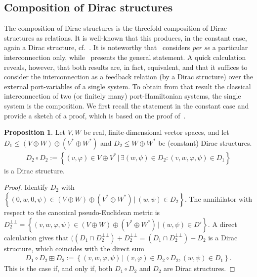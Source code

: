 \documentclass[preprint,12pt]{elsarticle}
\theoremstyle{definition}
\newtheorem{proposition}[theorem]{Proposition}
\newcommand{\bbot}{{\bot\!\!\!\bot}}
\newcommand{\set}[1]{\left\lbrace #1\right\rbrace}
\begin{document}
\subsection{Composition of Dirac structures}\label{geometric_approach}

The composition of Dirac structures is the threefold composition of Dirac structures as relations. It is well-known that this produces, in the constant case, again a Dirac structure, cf.~\cite{Interconnection07,Interconnection18}. It is noteworthy that~\cite{Interconnection07} considers \textit{per se} a particular interconnection only, while~\cite{Interconnection18} presents the general statement. A quick calculation reveals, however, that both results are, in fact, equivalent, and that it suffices to consider the interconnection as a feedback relation (by a Dirac structure) over the external port-variables of a single system. To obtain from that result the classical interconnection of two (or finitely many) port-Hamiltonian systems, the single system is the composition. We first recall the statement in the constant case and provide a sketch of a proof, which is based on the proof of~\cite[Lemma 5.2]{Burs13}.

\begin{proposition}\label{prop:geometric_composition}
Let $V,W$ be real, finite-dimensional vector spaces, and let ${D}_1\leq (V\oplus W)\oplus (V^*\oplus W^*)$ and ${D}_2\leq W\oplus W^*$ be (constant) Dirac structures.
\begin{align*}
{D}_2\circ{D}_2 := \set{(v,\varphi)\in V\oplus V^*\,\big\vert\,\exists (w,\psi)\in{D}_2: (v,w,\varphi,\psi)\in D_1}
\end{align*}
is a Dirac structure.
\end{proposition}
\begin{proof}
Identify $D_2$ with $\set{(0,w,0,\psi)\in(V\oplus W)\oplus (V^*\oplus W^*)\,\big\vert\,(w,\psi)\in D_2}$. The annihilator with respect to the canonical pseudo-Euclidean metric is $D_2^\bbot = \set{(v,w,\varphi,\psi)\in(V\oplus W)\oplus (V^*\oplus W^*)\,\big\vert\,(w,\psi)\in D'}$. A direct calculation gives that $((D_1\cap D_2^\bbot)+D_2^\bbot = (D_1\cap D_2^\bbot)+D_2$ is a Dirac structure, which coincides with the direct sum
\begin{align*}
{D}_1\circ{D}_2\boxplus D_2 := \set{(v,w,\varphi,\psi)\,\big\vert\,(v,\varphi)\in{D}_2\circ{D}_2, (w,\psi)\in D_1}.
\end{align*}
This is the case if, and only if, both ${D}_1\circ{D}_2$ and $D_2$ are Dirac structures.
\end{proof}
\end{document}
